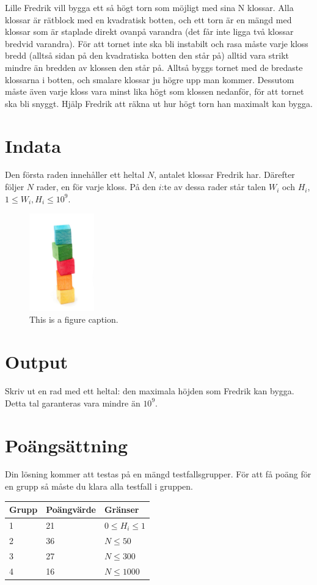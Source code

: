 Lille Fredrik vill bygga ett så högt torn som möjligt med sina N klossar. Alla klossar är rätblock med en kvadratisk botten, och ett torn är en mängd med klossar som är staplade direkt ovanpå varandra (det får inte ligga två klossar bredvid varandra). För att tornet inte ska bli instabilt och rasa måste varje kloss bredd (alltså sidan på den kvadratiska botten den står på) alltid vara strikt mindre än bredden av klossen den står på. Alltså byggs tornet med de bredaste klossarna i botten, och smalare klossar ju högre upp man kommer. Dessutom måste även varje kloss vara minst lika högt som klossen nedanför, för att tornet ska bli snyggt. Hjälp Fredrik att räkna ut hur högt torn han maximalt kan bygga.


\section*{Indata}
Den första raden innehåller ett heltal $N$, antalet klossar Fredrik har. Därefter följer $N$ rader, en för varje kloss. På den $i$:te av dessa rader står talen $W_i$ och $H_i$, $1 \leq W_i,H_i \leq 10^9$.

\begin{figure}
\centering
\includegraphics[width=0.25\textwidth]{klossar.jpg}
\caption{\label{fig:frog1}This is a figure caption.}
\end{figure}

\section*{Output}
Skriv ut en rad med ett heltal: den maximala höjden som Fredrik kan bygga. Detta tal garanteras vara mindre än $10^9$.
\section*{Poängsättning}
Din lösning kommer att testas på en mängd testfallsgrupper. För att få poäng för en grupp så måste du klara alla testfall i gruppen.
\begin{tabular}{|l|l|l|}
\hline
Grupp & Poängvärde & Gränser \\ \hline
 1     & 21         &  $0 \leq H_i \leq 1$ \\ \hline
 2     & 36         &  $N \leq 50$ \\ \hline
 3     & 27         &  $N \leq 300$ \\ \hline
 4     & 16         &  $N \leq 1000$ \\ \hline
\end{tabular}
